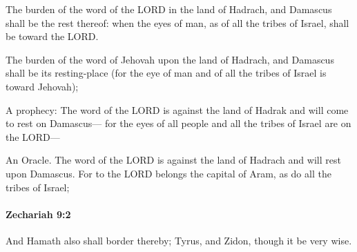 			The burden of the word of the LORD in the land of Hadrach, and Damascus shall be the rest thereof: when the eyes of man, as of all the tribes of Israel, shall be toward the LORD.

			\begin{versebox}
					\item[BHS] 
					\item[LXX] 
					\item[ASV] The burden of the word of Jehovah upon the land of Hadrach, and Damascus shall be its resting-place (for the eye of man and of all the tribes of Israel is toward Jehovah);
					\item[NIV] A prophecy: The word of the LORD is against the land of Hadrak and will come to rest on Damascus— for the eyes of all people and all the tribes of Israel are on the LORD—
					\item[NRSV] An Oracle. The word of the LORD is against the land of Hadrach and will rest upon Damascus. For to the LORD belongs the capital of Aram, as do all the tribes of Israel;
			\end{versebox}

		\paragraph{Zechariah 9:2} %
			\label{ZECHARIAH-9-2}

			And Hamath also shall border thereby; Tyrus, and Zidon, though it be very wise.

